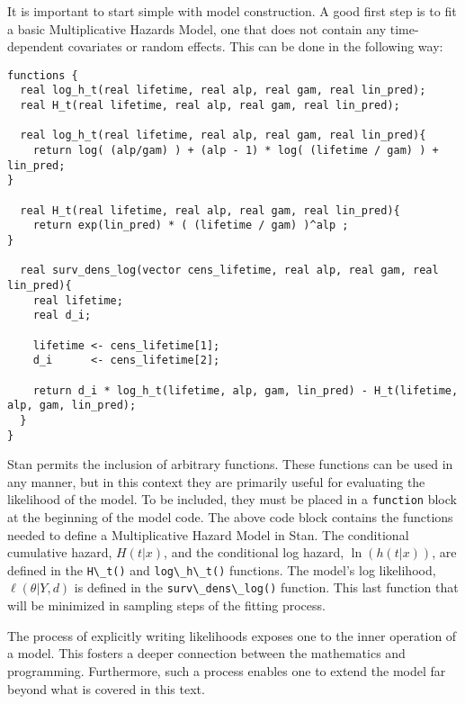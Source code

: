 It is important to start simple with model construction. A good first step is to fit a basic Multiplicative Hazards Model, one that does not contain any time-dependent covariates or random effects. This can be done in the following way:




\begin{lstlisting}
functions {
  real log_h_t(real lifetime, real alp, real gam, real lin_pred);
  real H_t(real lifetime, real alp, real gam, real lin_pred);

  real log_h_t(real lifetime, real alp, real gam, real lin_pred){
    return log( (alp/gam) ) + (alp - 1) * log( (lifetime / gam) ) + lin_pred;
}

  real H_t(real lifetime, real alp, real gam, real lin_pred){
    return exp(lin_pred) * ( (lifetime / gam) )^alp ;
}

  real surv_dens_log(vector cens_lifetime, real alp, real gam, real lin_pred){
    real lifetime;
    real d_i;
  
    lifetime <- cens_lifetime[1];
    d_i      <- cens_lifetime[2];
    
    return d_i * log_h_t(lifetime, alp, gam, lin_pred) - H_t(lifetime, alp, gam, lin_pred);
  }
}
\end{lstlisting}


Stan permits the inclusion of arbitrary functions. These functions can be used in any manner, but in this context they are primarily useful for evaluating the likelihood of the model. To be included, they must be placed in a \lstinline{function} block at the beginning of the model code. The above code block contains the functions needed to define a Multiplicative Hazard Model in Stan. The conditional cumulative hazard, $H(t|x)$, and the conditional log hazard, $\ln(h(t|x))$, are defined in the \lstinline{H\_t()} and \lstinline{log\_h\_t()} functions. The model's log likelihood, $\ell(\theta|Y, d)$ is defined in the \lstinline{surv\_dens\_log()} function. This last function that will be minimized in sampling steps of the fitting process. 

The process of explicitly writing likelihoods exposes one to the inner operation of a model. This fosters a deeper connection between the mathematics and programming. Furthermore, such a process enables one to extend the model far beyond what is covered in this text.

